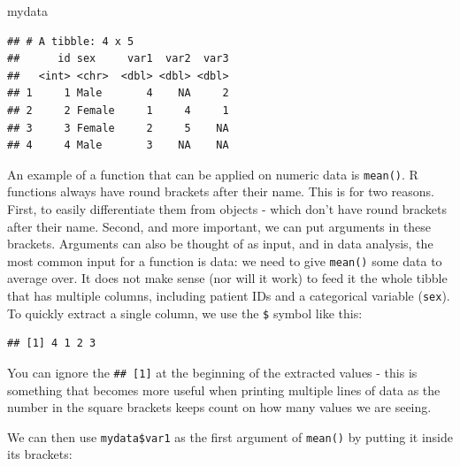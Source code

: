 \documentclass[12pt,]{krantz}
\makeatletter
\newenvironment{Shaded}{\begin{snugshade}}{\end{snugshade}}
\newcommand{\KeywordTok}[1]{\textcolor[rgb]{0.13,0.29,0.53}{\textbf{#1}}}
\newcommand{\NormalTok}[1]{#1}
\newcommand{\OperatorTok}[1]{\textcolor[rgb]{0.81,0.36,0.00}{\textbf{#1}}}
\newenvironment{kframe}{%
\medskip{}
\setlength{\fboxsep}{.8em}
 \def\at@end@of@kframe{}%
 \ifinner\ifhmode%
  \def\at@end@of@kframe{\end{minipage}}%
  \begin{minipage}{\columnwidth}%
 \fi\fi%
 \def\FrameCommand##1{\hskip\@totalleftmargin \hskip-\fboxsep
 \colorbox{shadecolor}{##1}\hskip-\fboxsep
     \hskip-\linewidth \hskip-\@totalleftmargin \hskip\columnwidth}%
 \MakeFramed {\advance\hsize-\width
   \@totalleftmargin\z@ \linewidth\hsize
   \@setminipage}}%
 {\par\unskip\endMakeFramed%
 \at@end@of@kframe}
\renewenvironment{Shaded}{\begin{kframe}}{\end{kframe}}
\theoremstyle{definition}
\theoremstyle{definition}
\theoremstyle{definition}
\theoremstyle{remark}
\makeatother
\begin{document}
\begin{Shaded}
\begin{Highlighting}[]
\NormalTok{mydata}
\end{Highlighting}
\end{Shaded}

\begin{verbatim}
## # A tibble: 4 x 5
##      id sex     var1  var2  var3
##   <int> <chr>  <dbl> <dbl> <dbl>
## 1     1 Male       4    NA     2
## 2     2 Female     1     4     1
## 3     3 Female     2     5    NA
## 4     4 Male       3    NA    NA
\end{verbatim}

An example of a function that can be applied on numeric data is
\texttt{mean()}. R functions always have round brackets after their
name. This is for two reasons. First, to easily differentiate them from
objects - which don't have round brackets after their name. Second, and
more important, we can put arguments in these brackets. Arguments can
also be thought of as input, and in data analysis, the most common input
for a function is data: we need to give \texttt{mean()} some data to
average over. It does not make sense (nor will it work) to feed it the
whole tibble that has multiple columns, including patient IDs and a
categorical variable (\texttt{sex}). To quickly extract a single column,
we use the \texttt{\$} symbol like this:

\begin{Shaded}
\end{Shaded}

\begin{verbatim}
## [1] 4 1 2 3
\end{verbatim}

You can ignore the \texttt{\#\#\ {[}1{]}} at the beginning of the
extracted values - this is something that becomes more useful when
printing multiple lines of data as the number in the square brackets
keeps count on how many values we are seeing.

We can then use \texttt{mydata\$var1} as the first argument of
\texttt{mean()} by putting it inside its brackets:

\begin{Shaded}
\end{Shaded}
\end{document}
